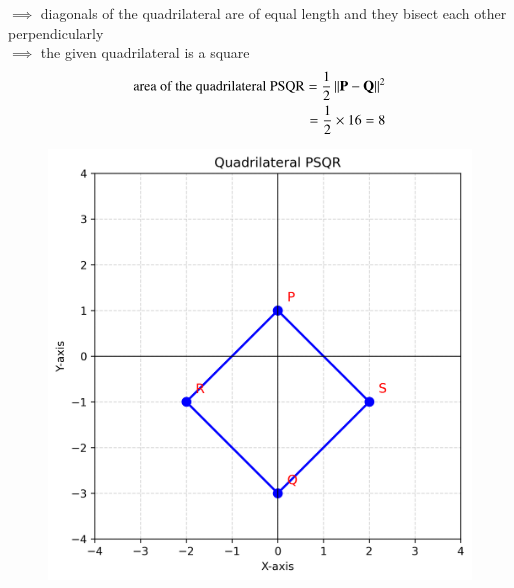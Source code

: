 \documentclass[journal]{IEEEtran}
\begin{document}
    $\implies$ diagonals of the quadrilateral are of equal length and they bisect each other perpendicularly \\
     $\implies$ the given quadrilateral is a square
     \begin{align}
         \text{area of the quadrilateral PSQR}=\frac{1}{2} \left\lVert\mathbf{P}-\mathbf{Q}\right\rVert^2\\
         =\frac{1}{2}\times 16 =8
     \end{align}

\begin{figure}
    \centering
    \includegraphics[width=0.52\columnwidth]{figs/01.png}
    \caption{}
    \label{fig:placeholder}
\end{figure}
\end{document}
